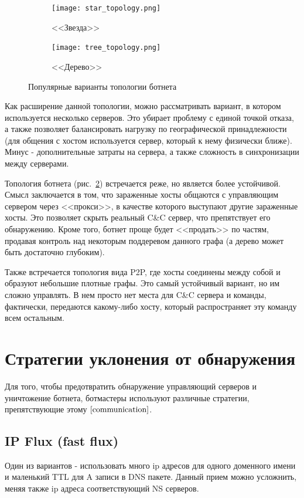 \documentclass[a4paper,14pt]{extreport} %
\begin{document}
\begin{figure}[H]
				
	\begin{subfigure}{0.5\textwidth}
		\texttt{[image: star\_topology.png]}
		\caption{<<Звезда>>}
		\label{fig:top1}
	\end{subfigure}
	\begin{subfigure}{0.5\textwidth}
		\texttt{[image: tree\_topology.png]}
		\caption{<<Дерево>>}
		\label{fig:top2}
	\end{subfigure}
				 
	\caption{Популярные варианты топологии ботнета}
	\label{fig:image2}
\end{figure}
Как расширение данной топологии, можно рассматривать вариант, в котором используется несколько серверов. Это убирает проблему с единой точкой отказа, а также позволяет балансировать нагрузку по географической принадлежности (для общения с хостом используется сервер, который к нему физически ближе). Минус - дополнительные затраты на сервера, а также сложность в синхронизации между серверами.
	
Топология ботнета (рис.~\ref{fig:top2}) встречается реже, но является более устойчивой. Смысл заключается в том, что зараженные хосты общаются с управляющим сервером через <<прокси>>, в качестве которого выступают другие зараженные хосты. Это позволяет скрыть реальный C\&C сервер, что препятствует его обнаружению. Кроме того, ботнет проще будет <<продать>> по частям, продавая контроль над некоторым поддеревом данного графа (а дерево может быть достаточно глубоким).
	
Также встречается топология вида P2P, где хосты соединены между собой и образуют небольшие плотные графы. Это самый устойчивый вариант, но им сложно управлять. В нем просто нет места для C\&C сервера и команды, фактически, передаются какому-либо хосту, который распространяет эту команду всем остальным.

\section{Стратегии уклонения от обнаружения}
Для того, чтобы предотвратить обнаружение управляющий серверов и уничтожение ботнета, ботмастеры используют различные стратегии, препятствующие этому $\cite{communication}$.
\subsection{IP Flux (fast flux)}
Один из вариантов - использовать много ip адресов для одного доменного имени и маленький TTL для A записи в DNS пакете. Данный прием можно усложнить, меняя также ip адреса соответствующий NS серверов.
	
\end{document}
